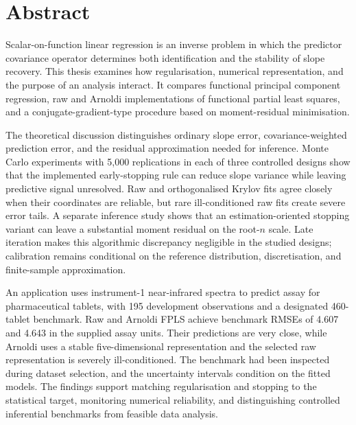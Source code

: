\chapter*{Abstract}
{}

Scalar-on-function linear regression is an inverse problem in which the
predictor covariance operator determines both identification and the
stability of slope recovery.  This thesis examines how regularisation,
numerical representation, and the purpose of an analysis interact.  It
compares functional principal component regression, raw and Arnoldi
implementations of functional partial least squares, and a
conjugate-gradient-type procedure based on moment-residual minimisation.

The theoretical discussion distinguishes ordinary slope error,
covariance-weighted prediction error, and the residual approximation needed
for inference.  Monte Carlo experiments with 5,000 replications in each of
three controlled designs show that the implemented early-stopping rule can
reduce slope variance while leaving predictive signal unresolved.  Raw and
orthogonalised Krylov fits agree closely when their coordinates are reliable,
but rare ill-conditioned raw fits create severe error tails.  A separate
inference study shows that an estimation-oriented stopping variant can leave
a substantial moment residual on the root-$n$ scale.  Late iteration makes this
algorithmic discrepancy negligible in the studied designs; calibration
remains conditional on the reference distribution, discretisation, and
finite-sample approximation.

An application uses instrument-1 near-infrared spectra to predict assay for
pharmaceutical tablets, with 195 development observations and a designated
460-tablet benchmark.  Raw and Arnoldi FPLS achieve benchmark RMSEs of 4.607
and 4.643 in the supplied assay units.  Their predictions are very close,
while Arnoldi uses a stable five-dimensional representation and the selected
raw representation is severely ill-conditioned.  The benchmark had been
inspected during dataset selection, and the uncertainty intervals condition
on the fitted models.  The findings support matching regularisation and
stopping to the statistical target, monitoring numerical reliability, and
distinguishing controlled inferential benchmarks from feasible data analysis.
